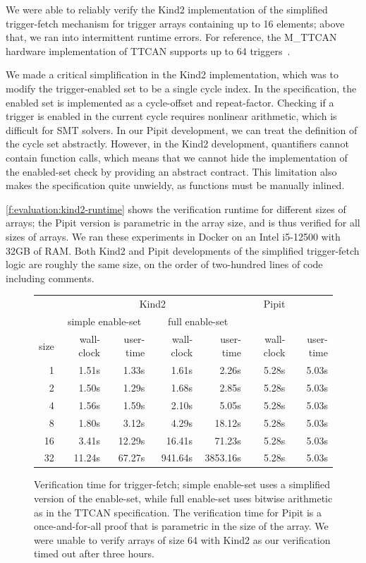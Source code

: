 \documentclass[a4paper,UKenglish,cleveref, autoref, thm-restate,anonymous]{lipics-v2021}
\begin{document}
We were able to reliably verify the Kind2 implementation of the simplified trigger-fetch mechanism for trigger arrays containing up to 16 elements; above that, we ran into intermittent runtime errors.
For reference, the M_TTCAN hardware implementation of TTCAN supports up to 64 triggers~\cite{bosch2019mttcan}.

We made a critical simplification in the Kind2 implementation, which was to modify the trigger-enabled set to be a single cycle index.
In the specification, the enabled set is implemented as a cycle-offset and repeat-factor.
Checking if a trigger is enabled in the current cycle requires nonlinear arithmetic, which is difficult for SMT solvers.
In our Pipit development, we can treat the definition of the cycle set abstractly.
However, in the Kind2 development, quantifiers cannot contain function calls, which means that we cannot hide the implementation of the enabled-set check by providing an abstract contract.
This limitation also makes the specification quite unwieldy, as functions must be manually inlined.

\autoref{f:evaluation:kind2-runtime} shows the verification runtime for different sizes of arrays; the Pipit version is parametric in the array size, and is thus verified for all sizes of arrays.
We ran these experiments in Docker on an Intel i5-12500 with 32GB of RAM.
Both Kind2 and Pipit developments of the simplified trigger-fetch logic are roughly the same size, on the order of two-hundred lines of code including comments.

\begin{figure}
  \center
\begin{tabular}{r|rr|rr|rr}
  & \multicolumn{4}{c|}{Kind2} & Pipit \\
  & \multicolumn{2}{c|}{simple enable-set} & \multicolumn{2}{c|}{full enable-set} & \\
  size & wall-clock & user-time & wall-clock & user-time & wall-clock & user-time \\
  \hline

  1 & 1.51s&1.33s
  & 1.61s&2.26s
  & 5.28s&5.03s \\
  2 & 1.50s&1.29s
  & 1.68s&2.85s
  & 5.28s&5.03s \\
  4 & 1.56s&1.59s
  & 2.10s&5.05s
  & 5.28s&5.03s \\
  8 & 1.80s&3.12s
  & 4.29s&18.12s
  & 5.28s&5.03s \\
  16 & 3.41s&12.29s
  & 16.41s&71.23s
  & 5.28s&5.03s \\
  32 & 11.24s&67.27s
  & 941.64s&3853.16s
  & 5.28s&5.03s \\
\end{tabular}
\caption{Verification time for trigger-fetch; simple enable-set uses a simplified version of the enable-set, while full enable-set uses bitwise arithmetic as in the TTCAN specification. The verification time for Pipit is a once-and-for-all proof that is parametric in the size of the array. We were unable to verify arrays of size 64 with Kind2 as our verification timed out after three hours.}
\label{f:evaluation:kind2-runtime}
\end{figure}
\end{document}
